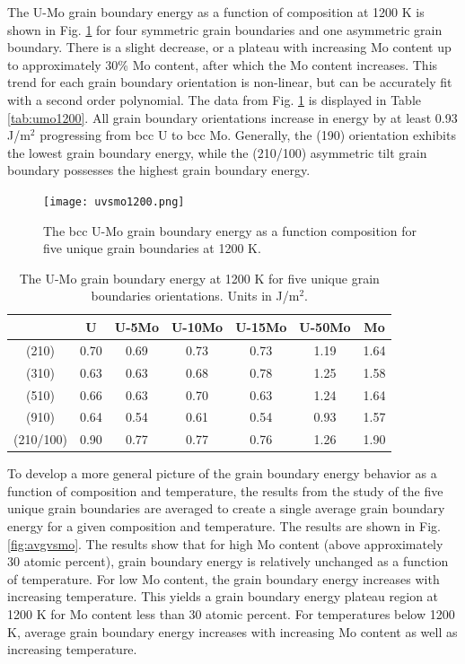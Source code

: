 \documentclass[review]{elsarticle}
\begin{document}
\FloatBarrier

The U-Mo grain boundary energy as a function of composition at 1200 K is shown in Fig. \ref{fig:umo1200} for four symmetric grain boundaries and one asymmetric grain boundary. There is a slight decrease, or a plateau with increasing Mo content up to approximately 30\% Mo content, after which the Mo content increases. This trend for each grain boundary orientation is non-linear, but can be accurately fit with a second order polynomial. The data from Fig. \ref{fig:umo1200} is displayed in Table \ref{tab:umo1200}. All grain boundary orientations increase in energy by at least 0.93 J/m$^{2}$ progressing from bcc U to bcc Mo. Generally, the (190) orientation exhibits the lowest grain boundary energy, while the (210/100) asymmetric tilt grain boundary possesses the highest grain boundary energy.

\begin{figure}[h]
 \centering
 \texttt{[image: uvsmo1200.png]} 
 \caption{The bcc U-Mo grain boundary energy as a function composition for five unique grain boundaries at 1200 K.}
 \label{fig:umo1200}
\end{figure}

\begin{table}[h]
\caption{The U-Mo grain boundary energy at 1200 K for five unique grain boundaries orientations. Units in J/m$^{2}$. } \label{tab:umo1200}
\begin{center}
\begin{tabular}{|c|c|c|c|c|c|c|}
	\hline
 & U & U-5Mo & U-10Mo & U-15Mo & U-50Mo & Mo \\
\hline
(210)	 & 0.70 & 0.69 & 0.73 & 0.73 & 1.19 & 1.64 \\
(310)	 & 0.63 & 0.63 & 0.68 & 0.78 & 1.25 & 1.58 \\
(510)	 & 0.66 & 0.63 & 0.70 & 0.63 & 1.24 & 1.64 \\
(910)	 & 0.64 & 0.54 & 0.61 & 0.54 & 0.93 & 1.57 \\
(210/100) & 0.90 & 0.77 & 0.77 & 0.76 & 1.26 & 1.90 \\
 	 \hline
\end{tabular}
\end{center}
\label{default}
\end{table}

\FloatBarrier

To develop a more general picture of the grain boundary energy behavior as a function of composition and temperature, the results from the study of the five unique grain boundaries are averaged to create a single average grain boundary energy for a given composition and temperature. The results are shown in Fig. \ref{fig:avgvsmo}. The results show that for high Mo content (above approximately 30 atomic percent), grain boundary energy is relatively unchanged as a function of temperature. For low Mo content, the grain boundary energy increases with increasing temperature. This yields a grain boundary energy plateau region at 1200 K for Mo content less than 30 atomic percent. For temperatures below 1200 K, average grain boundary energy increases with increasing Mo content as well as increasing temperature. 
\end{document}
